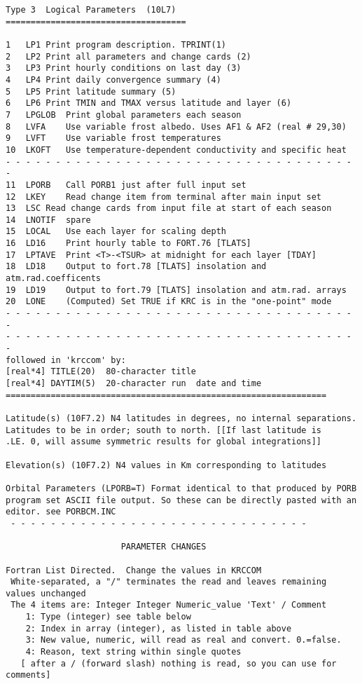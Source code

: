 \begin{verbatim}
Type 3	Logical Parameters	(10L7) ====================================

1	LP1	Print program description. TPRINT(1) 
2	LP2	Print all parameters and change cards (2)
3	LP3	Print hourly conditions on last day (3)
4	LP4	Print daily convergence summary (4)
5	LP5	Print latitude summary (5)
6	LP6	Print TMIN and TMAX versus latitude and layer (6)
7	LPGLOB	Print global parameters each season
8	LVFA	Use variable frost albedo. Uses AF1 & AF2 (real # 29,30)
9	LVFT	Use variable frost temperatures
10	LKOFT   Use temperature-dependent conductivity and specific heat
- - - - - - - - - - - - - - - - - - - - - - - - - - - - - - - - - - - - 
11	LPORB	Call PORB1 just after full input set
12	LKEY	Read change item from terminal after main input set
13	LSC	Read change cards from input file at start of each season
14	LNOTIF	spare
15	LOCAL	Use each layer for scaling depth
16	LD16	Print hourly table to FORT.76 [TLATS] 
17	LPTAVE	Print <T>-<TSUR> at midnight for each layer [TDAY]
18	LD18	Output to fort.78 [TLATS] insolation and atm.rad.coefficents
19	LD19	Output to fort.79 [TLATS] insolation and atm.rad. arrays 
20	LONE	(Computed) Set TRUE if KRC is in the "one-point" mode
- - - - - - - - - - - - - - - - - - - - - - - - - - - - - - - - - - - - 
- - - - - - - - - - - - - - - - - - - - - - - - - - - - - - - - - - - - 
followed in 'krccom' by: 
[real*4] TITLE(20)	80-character title
[real*4] DAYTIM(5)	20-character run  date and time
================================================================

Latitude(s) (10F7.2) N4 latitudes in degrees, no internal separations.
Latitudes to be in order; south to north. [[If last latitude is
.LE. 0, will assume symmetric results for global integrations]]

Elevation(s) (10F7.2) N4 values in Km corresponding to latitudes

Orbital Parameters (LPORB=T) Format identical to that produced by PORB
program set ASCII file output. So these can be directly pasted with an
editor. see PORBCM.INC
 - - - - - - - - - - - - - - - - - - - - - - - - - - - - - - 

                       PARAMETER CHANGES 

Fortran List Directed.  Change the values in KRCCOM	
 White-separated, a "/" terminates the read and leaves remaining values unchanged
 The 4 items are: Integer Integer Numeric_value 'Text' / Comment
    1: Type (integer) see table below
    2: Index in array (integer), as listed in table above
    3: New value, numeric, will read as real and convert. 0.=false.
    4: Reason, text string within single quotes
   [ after a / (forward slash) nothing is read, so you can use for comments]


\end{verbatim}
